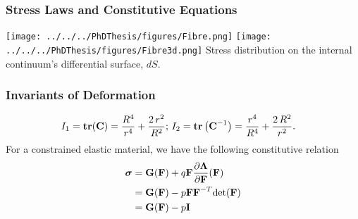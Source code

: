 \begin{frame}
	\frametitle{Stress Laws and Constitutive Equations}
	\centering
	\texttt{[image: ../../../PhDThesis/figures/Fibre.png]}
	\texttt{[image: ../../../PhDThesis/figures/Fibre3d.png]}
	\tiny{Stress distribution on the internal continuum's differential surface, $dS$.}
\end{frame}

\begin{frame}
	\frametitle{Invariants of Deformation}
		\begin{align}
		I_1 &= \textbf{tr}(\textbf{C}) =  \dfrac{R^4}{r^4} + \dfrac{2 \, r^2}{R^2};  \,
		I_2 = \textbf{tr}\left(\textbf{C}^{-1}\right) = \dfrac{r^4}{R^4} + \dfrac{2 \, R^2}{r^2}.
		\end{align}
		\label{eq:invariants_polar}
	For a constrained elastic material, we have the following constitutive relation 
\begin{align}
\cauchystress &= \materialresponse(\deformationgrad) + q \deformationgrad \dfrac{\partial \bm{\Lambda}}{\partial \deformationgrad}(\deformationgrad) \nonumber \\
&= \materialresponse(\deformationgrad) - p \deformationgrad \deformationgrad^{-T}  \text{det}(\deformationgrad) \nonumber \\
&= \materialresponse(\deformationgrad) - p \identity %
\label{eq:cauchy_stress2}
\end{align}
\end{frame}

